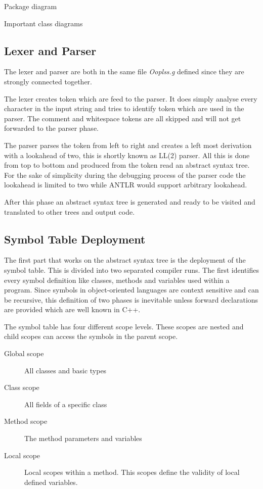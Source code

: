 Package diagram

Important class diagrams

\subsection{Lexer and Parser}
The lexer and parser are both in the same file \emph{Ooplss.g} defined
since they are strongly connected together. 

The lexer creates token which are feed to the parser. It does simply
analyse every character in the input string and tries to identify token
which are used in the parser. The comment and whitespace tokens are all
skipped and will not get forwarded to the parser phase.

The parser parses the token from left to right and creates a left most
derivation with a lookahead of two, this is shortly known as LL(2) parser.
All this is done from top to bottom and produced from the token read an 
abstract syntax tree. For the sake of simplicity during the debugging
process of the parser code the lookahead is limited to two while ANTLR
would support arbitrary lookahead.

After this phase an abstract syntax tree is generated and ready to be visited
and translated to other trees and output code.

\subsection{Symbol Table Deployment}
The first part that works on the abstract syntax tree is the deployment of
the symbol table. This is divided into two separated compiler runs. The
first identifies every symbol definition like classes, methods and
variables used within a program. Since symbols in object-oriented
languages are context sensitive and can be recursive, this definition
of two phases is inevitable unless forward declarations are provided
which are well known in C++.

The symbol table has four different scope levels. These scopes are nested
and child scopes can access the symbols in the parent scope.
\begin{description}
	\item[Global scope] All classes and basic types
	\item[Class scope] All fields of a specific class
	\item[Method scope] The method parameters and variables
	\item[Local scope] Local scopes within a method. This scopes
	define the validity of local defined variables.
\end{description}


